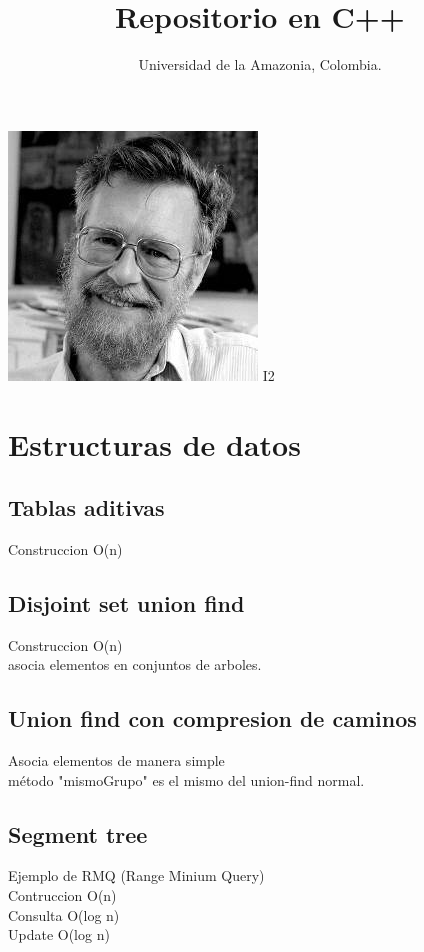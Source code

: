 \documentclass[10pt,landscape,twocolumn,a4paper,notitlepage]{article}
\newcommand\cppfile[2][]{

}
\begin{document}
	
	\title{Repositorio en C++}
	\author{Universidad de la Amazonia, Colombia.}
	\maketitle
	
	\begin{center}
		\includegraphics[scale=0.9]{dijkstra}
		\Huge{I2}
	\end{center}
	\normalsize
	\tableofcontents
	\hfill
	
		\section{Estructuras de datos}
			\subsection{Tablas aditivas}
			Construccion O(n)
			\cppfile[16-33]{estructuras_de_datos/tablas_aditivas.cpp}
			\subsection{Disjoint set union find}
			Construccion O(n)\\asocia elementos en conjuntos de arboles.
			\cppfile[6-47]{estructuras_de_datos/disjoint_set_union_find.cpp}
			\subsection{Union find con compresion de caminos}
			Asocia elementos de manera simple\\
			método "mismoGrupo" es el mismo del union-find normal.
			\cppfile[9-22]{estructuras_de_datos/union_find-compresion_de_caminos.cpp}
			\subsection{Segment tree}
			Ejemplo de RMQ (Range Minium Query)\\
			Contruccion O(n)\\Consulta O(log n)\\Update O(log n)
			\cppfile[8-68]{estructuras_de_datos/segment_tree.cpp}%
\end{document}
